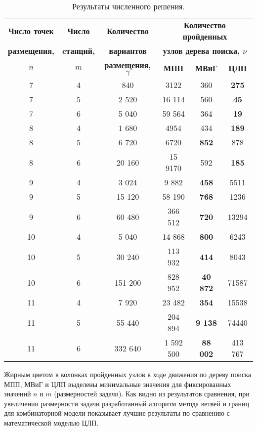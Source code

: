 \begin{table}
  \caption{Результаты численного решения.}\label{tab:models_comparation}
  \begin{tabular}{|ccc|*{3}{c}|} \cline{3-6}
  \hline
  \textbf{Число точек} & \textbf{Число} &\textbf{Количество} & \multicolumn{3}{c|}{\textbf{Количество пройденных}}\\ 
  \textbf{размещения,} & \textbf{cтанций,} & \textbf{вариантов} & \multicolumn{3}{c|}{\textbf{узлов дерева поиска, $\nu$}}\\
  \cline{4-6}
  \textbf{$n$} & \textbf{$m$} &\textbf{размещения, $\gamma$} & \textbf{МПП}& \textbf{МВиГ} & \textbf{ЦЛП} \\ 
  \hline
  7 &  4 & 840 & 3122 & 360 &  \textbf{275} \\
  7 &  5 & 2 520 & 16 114 & 560  &  \textbf{45}  \\
  7 &  6 & 5 040 & 59 564 & 364  &  \textbf{19}  \\
  8 &  4 & 1 680 &  4954 &  434 &   \textbf{189} \\
  8 &  5 & 6 720 & 6720 & \textbf{852}  &  878 \\
  8 &  6 & 20 160 &  15 9170 & 592  & \textbf{185}  \\
  9  &  4 & 3 024 & 9 882 & \textbf{458} & 5511 \\
  9  &  5 & 15 120&  58 190 &  \textbf{768} &  1236\\
  9  &  6 & 60 480&  366 512 &  \textbf{720} & 13294 \\
  10 &  4 & 5 040&  14 868&  \textbf{800}&  6243\\
  10 &	5 & 30 240&  113 932&  \textbf{414}&  8043\\
  10 &	6 & 151 200&  828 952&  \textbf{40 872}&  71587\\
  11 &  4 & 7 920& 23 482&  \textbf{354} & 15538\\
  11 &	5 & 55 440& 204 894& \textbf{9 138}&  74440\\
  11 &	6 & 332 640& 1 592 500 & \textbf{88 002} & 413 767 \\
  \hline
  \end{tabular}
\end{table} 

Жирным цветом в колонках пройденных узлов в ходе движения по дереву поиска МПП, МВиГ и ЦЛП выделены минимальные значения для фиксированных значений $n$ и $m$ (размерностей задачи). Как видно из результатов сравнения, при увеличении размерности задачи разработанный алгоритм метода ветвей и границ для комбинаторной модели показывает лучшие результаты по сравнению с математической моделью ЦЛП.